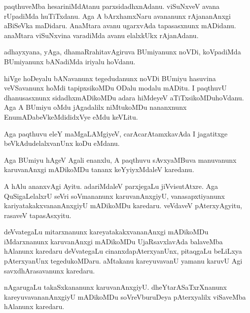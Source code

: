 \documentclass{article}
\begin{document}
\begin{mn}%
paqthuveMba hesariniMdAtanu parxsidadhxnAdanu. viSuNxveV avana
rUpadiMda huTiTxdanu. Aga A bArxhamxNaru avananunx rAjananAnxgi
aBiSeVka maDidaru. AnaMtara avanu ugarxvAda tapasasxnunx
mADidanu. anaMtara viSuNxvina varadiMda avanu elalxkUkx rAjanAdanu.
\end{mn}

\begin{mn}
adhayxyana, yAga, dhamaRrahitavAgiruva BUmiyanunx noVDi, koVpadiMda
BUmiyanunx bANadiMda iriyalu hoVdanu.
\end{mn}

\begin{mn}%
hiVge hoDeyalu bANavanunx tegedudanunx noVDi BUmiyu hasuvina
veVSavanunx hoMdi tapipxsikoMDu ODalu modalu mADitu. I paqthuvU
dhanusasxnunx sidadhxmADikoMDu adara hiMdeyeV aTiTxsikoMDuhoVdanu. Aga
A BUmiyu oMdu jAgadalilx niMtukoMDu nananxnunx EnumADabeVkeMdididxVye
eMdu keVLitu.
\end{mn}

\begin{mn}%
Aga paqthuvu eleY maMgaLAMgiyeV, carAcarAtamxkavAda I jagatitxge
beVkAdudelalxvanUnx koDu eMdanu.
\end{mn}

\begin{mn}
Aga BUmiyu hAgeV Agali enanxlu, A paqthuvu sAvxyaMBuva manuvanunx
karuvanAnxgi mADikoMDu tananx keYyiyxMdaleV karedanu.
\end{mn}

\begin{mn}
A hAlu ananxvAgi Ayitu. adariMdaleV parxjegaLu jiVvisutAtxre. Aga
QuSigaLelalxrU seVri soVmananunx karuvanAnxgiyU, vanasapxtiyanunx
kariyatakakxvananAnxgiyU mADikoMDu karedaru. veVdaveV pAterxyAgyitu,
rasaveV tapasAsxyitu.
\end{mn}

\begin{mn}
deVvategaLu mitarxnanunx kareyatakakxvananAnxgi mADikoMDu iMdarxnanunx
karuvanAnxgi mADikoMDu UjaRsavxlavAda balaveMba hAlanunx karedaru
deVvategaLu cinanxdapAterxyanUnx, pitaqgaLu beLiLxya pAterxyanUnx
tegedukoMDaru. aMtakanu kareyuvavanU yamanu karuvU Agi
savxdhArasavanunx karedaru.
\end{mn}

\begin{mn}%
nAgarugaLu takaSxkananunx karuvanAnxgiyU. dheYtarASaTxrXnanunx
kareyuvavananAnxgiyU mADikoMDu soVreVburuDeya pAterxyalilx viSaveMba
hAlanunx karedaru.
\end{mn}
\end{document}
